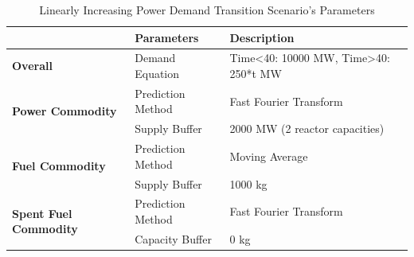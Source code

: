 \documentclass{anstrans}
\begin{document}
\begin{table}[!htbp]
    \centering
    \caption {Linearly Increasing Power Demand Transition Scenario's Parameters}
	\label{tab:transition-scenario-growing-power}
    \begin{tabular}{|l|l|p{4.5cm}|}
    \hline
                                     & \textbf{Parameters}    & \textbf{Description} \\ \hline
    \textbf{Overall}& Demand Equation & Time<40: 10000 MW, Time>40: 250*t MW \\ \hline
    \multirow{2}{*}{\textbf{Power Commodity}} & Prediction Method      &  Fast Fourier Transform \\ \cline{2-3} 
                                     & Supply Buffer          &  2000 MW (2 reactor capacities)\\ \hline
    \multirow{2}{*}{\textbf{Fuel Commodity}}  & Prediction Method      &  Moving Average\\ \cline{2-3}
                                     & Supply Buffer & 1000 kg \\ \hline
    \multirow{2}{*}{\textbf{Spent Fuel Commodity}}  & Prediction Method      &  Fast Fourier Transform \\ \cline{2-3}
                                     & Capacity Buffer & 0 kg \\ \hline
    \end{tabular}
\end{table}
\end{document}
